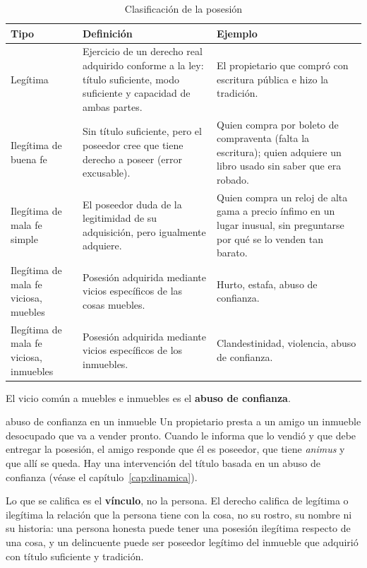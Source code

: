 \documentclass[12pt,oneside]{book}
\begin{document}
\begin{table}[H]
\centering
\small
\begin{tabularx}{\textwidth}{>{\raggedright\arraybackslash}p{}>{\raggedright\arraybackslash}X>{\raggedright\arraybackslash}X}
\toprule
\textbf{Tipo} & \textbf{Definición} & \textbf{Ejemplo} \\
\midrule
Legítima & Ejercicio de un derecho real adquirido conforme a la ley: título suficiente, modo suficiente y capacidad de ambas partes. & El propietario que compró con escritura pública e hizo la tradición. \\
Ilegítima de buena fe & Sin título suficiente, pero el poseedor cree que tiene derecho a poseer (error excusable). & Quien compra por boleto de compraventa (falta la escritura); quien adquiere un libro usado sin saber que era robado. \\
Ilegítima de mala fe simple & El poseedor duda de la legitimidad de su adquisición, pero igualmente adquiere. & Quien compra un reloj de alta gama a precio ínfimo en un lugar inusual, sin preguntarse por qué se lo venden tan barato. \\
Ilegítima de mala fe viciosa, muebles & Posesión adquirida mediante vicios específicos de las cosas muebles. & Hurto, estafa, abuso de confianza. \\
Ilegítima de mala fe viciosa, inmuebles & Posesión adquirida mediante vicios específicos de los inmuebles. & Clandestinidad, violencia, abuso de confianza. \\
\bottomrule
\end{tabularx}
\caption{Clasificación de la posesión}
\end{table}

El vicio común a muebles e inmuebles es el \textbf{abuso de confianza}.

\begin{ejemplo}{abuso de confianza en un inmueble}
Un propietario presta a un amigo un inmueble desocupado que va a vender pronto. Cuando le informa que lo vendió y que debe entregar la posesión, el amigo responde que él es poseedor, que tiene \textit{animus} y que allí se queda. Hay una intervención del título basada en un abuso de confianza (véase el capítulo~\ref{cap:dinamica}).
\end{ejemplo}

\begin{importante}
Lo que se califica es el \textbf{vínculo}, no la persona. El derecho califica de legítima o ilegítima la relación que la persona tiene con la cosa, no su rostro, su nombre ni su historia: una persona honesta puede tener una posesión ilegítima respecto de una cosa, y un delincuente puede ser poseedor legítimo del inmueble que adquirió con título suficiente y tradición.
\end{importante}
\end{document}
